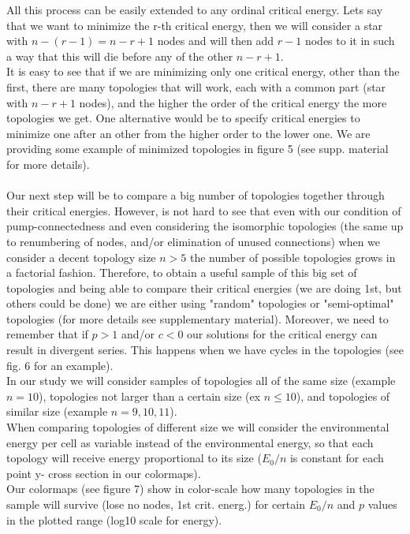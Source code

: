 \documentclass{amsart}
\theoremstyle{plain}
\numberwithin{equation}{section}
\begin{document}
All this process can be easily extended to any ordinal critical energy. Lets say that we want to minimize the r-th critical energy, then we will consider a star with $n-(r-1)=n-r+1$ nodes and will then add $r-1$ nodes to it in such a way that this will die before any of the other $n-r+1$.\\
It is easy to see that if we are minimizing only one critical energy, other than the first, there are many topologies that will work, each with a common part (star with $n-r+1$ nodes), and the higher the order of the critical energy the more topologies we get. One alternative would be to specify critical energies to minimize one after an other from the higher order to the lower one. We are providing some example of minimized topologies in figure 5 (see supp. material for more details).\\\\
Our next step will be to compare a big number of topologies together through their critical energies. However, is not hard to see that even with our condition of pump-connectedness and even considering the isomorphic topologies (the same up to renumbering of nodes, and/or elimination of unused connections) when we consider a decent topology size $n>5$ the number of possible topologies grows in a factorial fashion. Therefore, to obtain a useful sample of this big set of topologies and being able to compare their critical energies (we are doing 1st, but others could be done) we are either using "random" topologies or "semi-optimal" topologies (for more details see supplementary material). Moreover, we need to remember that if $p>1$ and/or $c<0$ our solutions for the critical energy can result in divergent series. This happens when we have cycles in the topologies (see fig. 6 for an example).\\
In our study we will consider samples of topologies all of the same size (example $n=10$), topologies not larger than a certain size (ex $n\leq10$),  and topologies of similar size (example $n=9,10,11$).\\
When comparing topologies of different size we will consider the environmental energy per cell as variable instead of the environmental energy, so that each topology will receive energy proportional to its size ($E_0/n$ is constant for each point y- cross section in our colormaps).\\
Our colormaps (see figure 7) show in color-scale how many topologies in the sample will survive (lose no nodes, 1st crit. energ.) for certain $E_0/n$ and $p$ values in the plotted range (log10 scale for energy).
\end{document}

